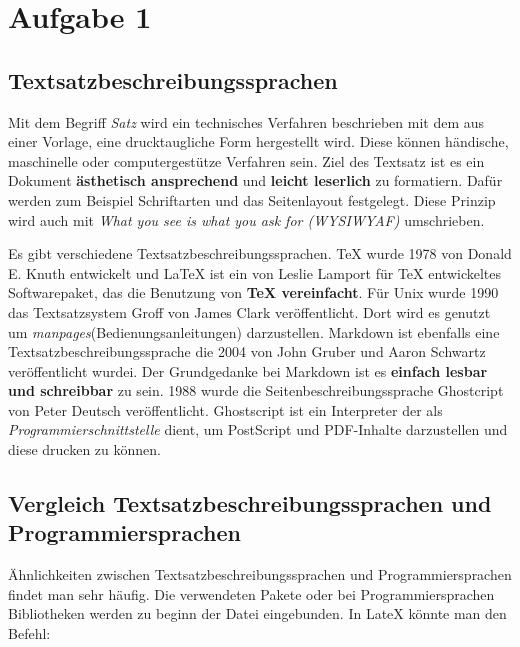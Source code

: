 \chapter{Aufgabe 1}
\section{Textsatzbeschreibungssprachen}
Mit dem Begriff \textit{Satz} wird ein technisches Verfahren beschrieben mit dem aus einer Vorlage, eine drucktaugliche Form hergestellt wird.
Diese können händische, maschinelle oder computergestütze Verfahren sein.
Ziel des Textsatz ist es ein Dokument \textbf{ästhetisch ansprechend} und \textbf{leicht leserlich} zu formatiern.
Dafür werden zum Beispiel Schriftarten und das Seitenlayout festgelegt\cite{satzwiki:2023}.
Diese Prinzip wird auch mit \textit{What you see is what you ask for (WYSIWYAF)} umschrieben.\par
Es gibt verschiedene Textsatzbeschreibungssprachen.
TeX wurde 1978 von Donald E. Knuth entwickelt und LaTeX\cite{latex:2023} ist ein von Leslie Lamport für TeX\cite{tex:2023} entwickeltes Softwarepaket, das die Benutzung von \textbf{TeX vereinfacht}.
Für Unix wurde 1990 das Textsatzsystem Groff von James Clark veröffentlicht.
Dort wird es genutzt um \textit{manpages}(Bedienungsanleitungen) darzustellen\cite{groff:2022}.
Markdown ist ebenfalls eine Textsatzbeschreibungssprache die 2004 von John Gruber und Aaron Schwartz veröffentlicht wurdei.
Der Grundgedanke bei Markdown ist es \textbf{einfach lesbar und schreibbar} zu sein\cite{lasar:2013}.
1988 wurde die Seitenbeschreibungssprache Ghostcript von Peter Deutsch veröffentlicht.
Ghostscript ist ein Interpreter der als \textit{Programmierschnittstelle} dient, um PostScript und PDF-Inhalte darzustellen und diese drucken zu können\cite{ghostscript:2022}. 

\section{Vergleich Textsatzbeschreibungssprachen und Programmiersprachen}
Ähnlichkeiten zwischen Textsatzbeschreibungssprachen und Programmiersprachen findet man sehr häufig. 
Die verwendeten Pakete oder bei Programmiersprachen Bibliotheken werden zu beginn der Datei eingebunden.
In LateX könnte man den Befehl:
\begin{lstlisting}
 


\end{lstlisting}

